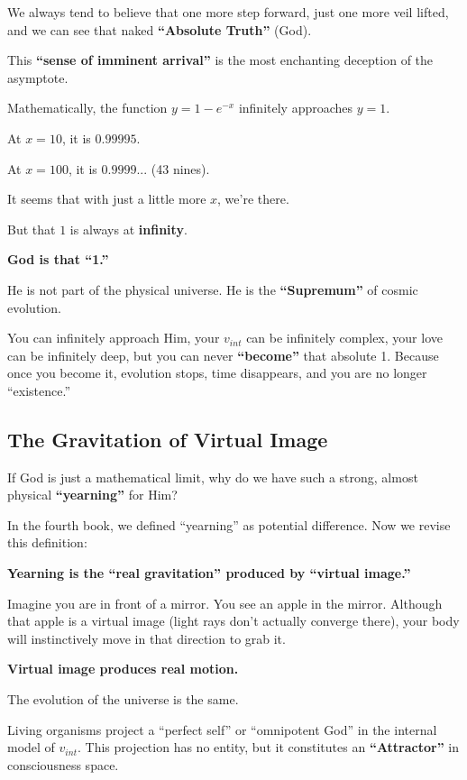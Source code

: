 We always tend to believe that one more step forward, just one more veil lifted, and we can see that naked \textbf{``Absolute Truth''} (God).

This \textbf{``sense of imminent arrival''} is the most enchanting deception of the asymptote.

Mathematically, the function $y = 1 - e^{-x}$ infinitely approaches $y=1$.

At $x=10$, it is $0.99995$.

At $x=100$, it is $0.9999...$ (43 nines).

It seems that with just a little more $x$, we're there.

But that $1$ is always at \textbf{infinity}.

\textbf{God is that ``1.''}

He is not part of the physical universe. He is the \textbf{``Supremum''} of cosmic evolution.

You can infinitely approach Him, your $v_{int}$ can be infinitely complex, your love can be infinitely deep, but you can never \textbf{``become''} that absolute 1. Because once you become it, evolution stops, time disappears, and you are no longer ``existence.''

\subsection{The Gravitation of Virtual Image}

If God is just a mathematical limit, why do we have such a strong, almost physical \textbf{``yearning''} for Him?

In the fourth book, we defined ``yearning'' as potential difference. Now we revise this definition:

\textbf{Yearning is the ``real gravitation'' produced by ``virtual image.''}

Imagine you are in front of a mirror. You see an apple in the mirror. Although that apple is a virtual image (light rays don't actually converge there), your body will instinctively move in that direction to grab it.

\textbf{Virtual image produces real motion.}

The evolution of the universe is the same.

Living organisms project a ``perfect self'' or ``omnipotent God'' in the internal model of $v_{int}$. This projection has no entity, but it constitutes an \textbf{``Attractor''} in consciousness space.

